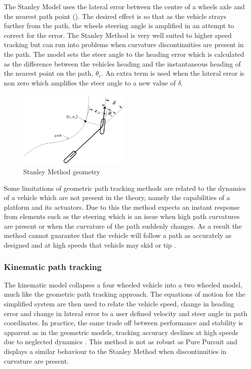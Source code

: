 \documentclass[main.tex]{subfiles}
\begin{document}
The Stanley Model uses the lateral error between the centre of a wheels axle and the nearest path point (). The desired effect is so that as the vehicle strays further from the path, the wheels steering angle is amplified in an attempt to correct for the error. The Stanley Method is very well suited to higher speed tracking but can run into problems when curvature discontinuities are present in the path. The model sets the steer angle to the heading error which is calculated as the difference between the vehicles heading and the instantaneous heading of the nearest point on the path, $\theta_e$. An extra term is used when the lateral error is non zero which amplifies the steer angle to a new value of $\delta$.
\begin{figure}[ht]
\includegraphics[width=0.5\textwidth]{2-LiteratureReview/stanleyMethod.png}
\centering
\caption[Stanley Method geometry]{Stanley Method geometry \parencite{snider2009}} 
\end{figure}

Some limitations of geometric path tracking methods are related to the dynamics of a vehicle which are not present in the theory, namely the capabilities of a platform and its actuators. Due to this the method expects an instant response from elements such as the steering which is an issue when high path curvatures are present or when the curvature of the path suddenly changes. As a result the method cannot guarantee that the vehicle will follow a path as accurately as designed and at high speeds that vehicle may skid or tip \parencite{coulter1992}.

\subsubsection{Kinematic path tracking}
The kinematic model collapses a four wheeled vehicle into a two wheeled model, much like the geometric path tracking approach. The equations of motion for the simplified system are then used to relate the vehicle speed, change in heading error and change in lateral error to a user defined velocity and steer angle in path coordinates. In practice, the same trade off between performance and stability is apparent as in the geometric models, tracking accuracy declines at high speeds due to neglected dynamics \parencite{snider2009}. This method is not as robust as Pure Pursuit and displays a similar behaviour to the Stanley Method when discontinuities in curvature are present.
\end{document}
